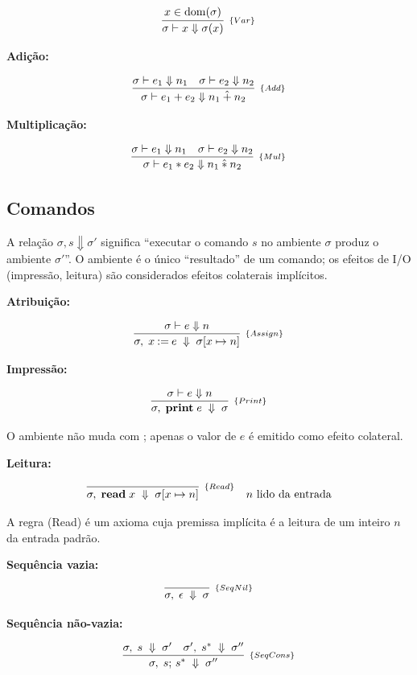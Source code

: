 \[
  \infer[_{\{Var\}}]{\sigma \vdash x \Downarrow \sigma(x)}{x \in
  \mathrm{dom}(\sigma)}
\]

\textbf{Adição:}

\[
  \infer[_{\{Add\}}]{\sigma \vdash e_1 + e_2 \Downarrow n_1
  \mathbin{\hat{+}} n_2}{\sigma \vdash e_1 \Downarrow n_1 & \sigma
  \vdash e_2 \Downarrow n_2}
\]

\textbf{Multiplicação:}

\[
  \infer[_{\{Mul\}}]{\sigma \vdash e_1 * e_2 \Downarrow n_1
  \mathbin{\hat{*}} n_2}{\sigma \vdash e_1 \Downarrow n_1 & \sigma
  \vdash e_2 \Downarrow n_2}
\]

\subsection{Comandos}

A relação \(\sigma, s \Downarrow \sigma'\) significa ``executar o
comando \(s\) no ambiente \(\sigma\) produz o ambiente \(\sigma'\)''.
O ambiente é o único ``resultado'' de um comando; os efeitos de I/O
(impressão, leitura) são considerados efeitos colaterais implícitos.

\textbf{Atribuição:}

\[
  \infer[_{\{Assign\}}]{\sigma,\; x \mathbin{:=} e \;\Downarrow\;
  \sigma[x \mapsto n]}{\sigma \vdash e \Downarrow n}
\]

\textbf{Impressão:}

\[
  \infer[_{\{Print\}}]{\sigma,\; \mathbf{print}\; e \;\Downarrow\;
  \sigma}{\sigma \vdash e \Downarrow n}
\]

O ambiente não muda com ; apenas o
valor de \(e\) é emitido como efeito colateral.

\textbf{Leitura:}

\[
  \infer[_{\{Read\}}]{\sigma,\; \mathbf{read}\; x \;\Downarrow\;
  \sigma[x \mapsto n]}{}
  \quad n \text{ lido da entrada}
\]

A regra (Read) é um axioma cuja premissa implícita é a leitura de um
inteiro \(n\) da entrada padrão.

\textbf{Sequência vazia:}

\[
  \infer[_{\{SeqNil\}}]{\sigma,\; \epsilon \;\Downarrow\; \sigma}{}
\]

\textbf{Sequência não-vazia:}

\[
  \infer[_{\{SeqCons\}}]{\sigma,\; s;\, s^* \;\Downarrow\;
  \sigma''}{\sigma,\; s \;\Downarrow\; \sigma' \quad \sigma',\; s^*
  \;\Downarrow\; \sigma''}
\]

